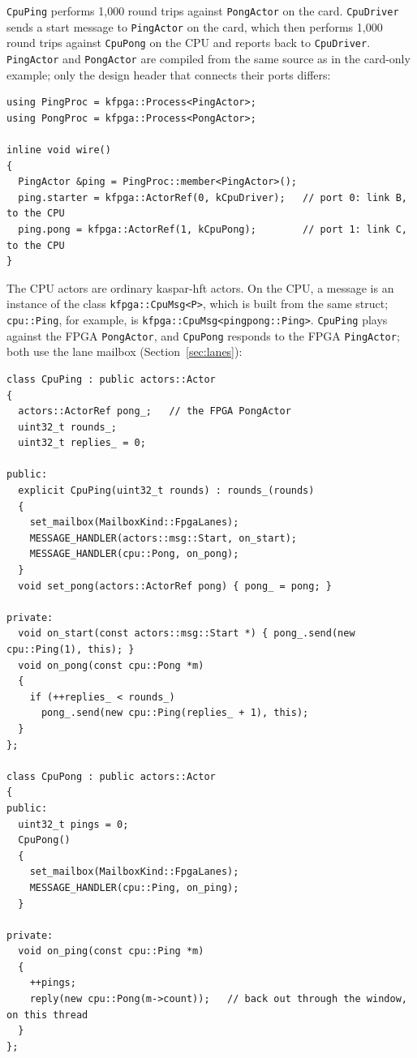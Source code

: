 \documentclass[11pt]{article}
\begin{document}
\texttt{CpuPing} performs 1{,}000 round trips against \texttt{PongActor} on the
card. \texttt{CpuDriver} sends a start message to \texttt{PingActor} on the
card, which then performs 1{,}000 round trips against \texttt{CpuPong} on the
CPU and reports back to \texttt{CpuDriver}. \texttt{PingActor} and
\texttt{PongActor} are compiled from the same source as in the card-only
example; only the design header that connects their ports differs:

\begin{lstlisting}
using PingProc = kfpga::Process<PingActor>;
using PongProc = kfpga::Process<PongActor>;

inline void wire()
{
  PingActor &ping = PingProc::member<PingActor>();
  ping.starter = kfpga::ActorRef(0, kCpuDriver);   // port 0: link B, to the CPU
  ping.pong = kfpga::ActorRef(1, kCpuPong);        // port 1: link C, to the CPU
}
\end{lstlisting}

\noindent The CPU actors are ordinary kaspar-hft actors. On the CPU, a message
is an instance of the class \texttt{kfpga::CpuMsg<P>}, which is built from the
same struct; \texttt{cpu::Ping}, for example, is
\texttt{kfpga::CpuMsg<pingpong::Ping>}. \texttt{CpuPing} plays against the FPGA
\texttt{PongActor}, and \texttt{CpuPong} responds to the FPGA
\texttt{PingActor}; both use the lane mailbox (Section~\ref{sec:lanes}):

\begin{lstlisting}
class CpuPing : public actors::Actor
{
  actors::ActorRef pong_;   // the FPGA PongActor
  uint32_t rounds_;
  uint32_t replies_ = 0;

public:
  explicit CpuPing(uint32_t rounds) : rounds_(rounds)
  {
    set_mailbox(MailboxKind::FpgaLanes);
    MESSAGE_HANDLER(actors::msg::Start, on_start);
    MESSAGE_HANDLER(cpu::Pong, on_pong);
  }
  void set_pong(actors::ActorRef pong) { pong_ = pong; }

private:
  void on_start(const actors::msg::Start *) { pong_.send(new cpu::Ping(1), this); }
  void on_pong(const cpu::Pong *m)
  {
    if (++replies_ < rounds_)
      pong_.send(new cpu::Ping(replies_ + 1), this);
  }
};

class CpuPong : public actors::Actor
{
public:
  uint32_t pings = 0;
  CpuPong()
  {
    set_mailbox(MailboxKind::FpgaLanes);
    MESSAGE_HANDLER(cpu::Ping, on_ping);
  }

private:
  void on_ping(const cpu::Ping *m)
  {
    ++pings;
    reply(new cpu::Pong(m->count));   // back out through the window, on this thread
  }
};
\end{lstlisting}
\end{document}
